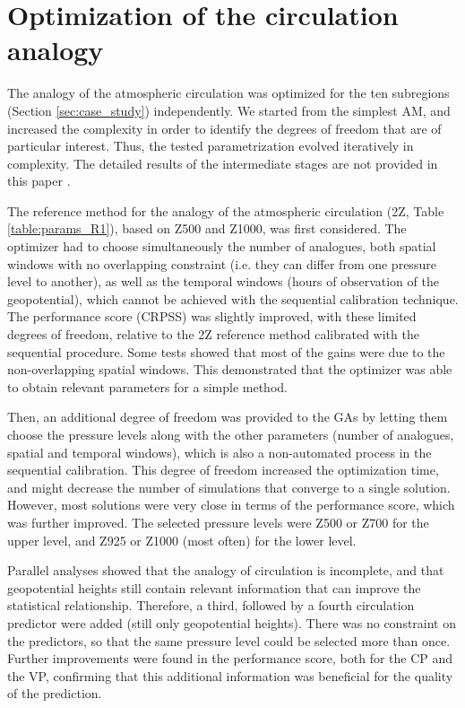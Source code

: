 \documentclass[review]{elsarticle}
\begin{document}
\section{Optimization of the circulation analogy}
\label{sec:optim_circul}

The analogy of the atmospheric circulation was optimized for the ten subregions (Section \ref{sec:case_study}) independently. We started from the simplest AM, and increased the complexity in order to identify the degrees of freedom that are of particular interest. Thus, the tested parametrization evolved iteratively in complexity. The detailed results of the intermediate stages are not provided in this paper \citep[see][for the details]{Horton2012a}.

The reference method for the analogy of the atmospheric circulation (2Z, Table \ref{table:params_R1}), based on Z500 and Z1000, was first considered. The optimizer had to choose simultaneously the number of analogues, both spatial windows with no overlapping constraint (i.e. they can differ from one pressure level to another), as well as the temporal windows (hours of observation of the geopotential), which cannot be achieved with the sequential calibration technique. The performance score (CRPSS) was slightly improved, with these limited degrees of freedom, relative to the 2Z reference method calibrated with the sequential procedure. Some tests showed that most of the gains were due to the non-overlapping spatial windows. This demonstrated that the optimizer was able to obtain relevant parameters for a simple method.

Then, an additional degree of freedom was provided to the GAs by letting them choose the pressure levels along with the other parameters (number of analogues, spatial and temporal windows), which is also a non-automated process in the sequential calibration. This degree of freedom increased the optimization time, and might decrease the number of simulations that converge to a single solution. However, most solutions were very close in terms of the performance score, which was further improved. The selected pressure levels were Z500 or Z700 for the upper level, and Z925 or Z1000 (most often) for the lower level.

Parallel analyses showed that the analogy of circulation is incomplete, and that geopotential heights still contain relevant information that can improve the statistical relationship. Therefore, a third, followed by a fourth circulation predictor were added (still only geopotential heights). There was no constraint on the predictors, so that the same pressure level could be selected more than once. Further improvements were found in the performance score, both for the CP and the VP, confirming that this additional information was beneficial for the quality of the prediction. 
\end{document}
